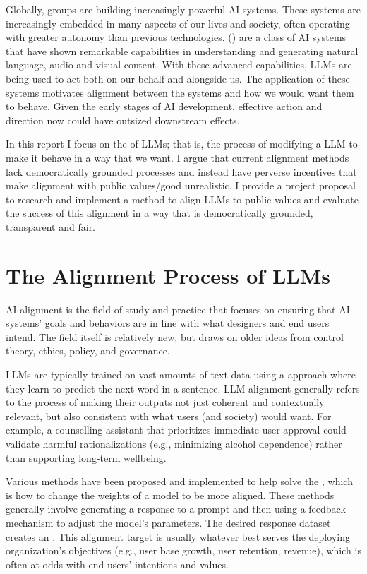 Globally, groups are building increasingly powerful AI systems. These systems are increasingly embedded in many aspects of our lives and society, often operating with greater autonomy than previous technologies.  () are a class of AI systems that have shown remarkable capabilities in understanding and generating natural language, audio and visual content. With these advanced capabilities, LLMs are being used to act both on our behalf and alongside us. The application of these systems motivates alignment between the systems and how we would want them to behave. Given the early stages of AI development, effective action and direction now could have outsized downstream effects.

In this report I focus on the  of LLMs; that is, the process of modifying a  LLM to make it behave in a way that we want. I argue that current alignment methods lack democratically grounded processes and instead have perverse incentives that make alignment with public values/good unrealistic. I provide a project proposal to research and implement a method to align LLMs to public values and evaluate the success of this alignment in a way that is democratically grounded, transparent and fair.

\section{The Alignment Process of LLMs}

AI alignment is the field of study and practice that focuses on ensuring that AI systems' goals and behaviors are in line with what designers and end users intend. The field itself is relatively new, but draws on older ideas from control theory, ethics, policy, and governance.

LLMs are typically trained on vast amounts of text data using a  approach where they learn to predict the next word in a sentence. LLM alignment generally refers to the process of making their outputs not just coherent and contextually relevant, but also consistent with what users (and society) would want. For example, a counselling assistant that prioritizes immediate user approval could validate harmful rationalizations (e.g., minimizing alcohol dependence) rather than supporting long-term wellbeing.

Various methods have been proposed and implemented to help solve the , which is how to change the weights of a model to be more aligned. These methods generally involve generating a response to a prompt and then using a feedback mechanism to adjust the model's parameters. The desired response dataset creates an . This alignment target is usually whatever best serves the deploying organization's objectives (e.g., user base growth, user retention, revenue), which is often at odds with end users' intentions and values.

